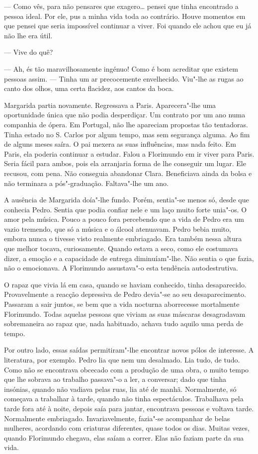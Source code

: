 --- Como vês, para não pensares que exagero\ldots{} pensei que tinha encontrado
a pessoa ideal. Por ele, pus a minha vida toda ao contrário. Houve
momentos em que pensei que seria impossível continuar a viver. Foi
quando ele achou que eu já não lhe era útil.

--- Vive do quê?

--- Ah, és tão maravilhosamente ingénuo! Como é bom acreditar que existem
pessoas assim. --- Tinha um ar precocemente envelhecido. Viu"-lhe as rugas
ao canto dos olhos, uma certa flacidez, aos cantos da boca.

Margarida partia novamente. Regressava a Paris. Aparecera"-lhe uma
oportunidade única que não podia desperdiçar. Um contrato por um ano
numa companhia de ópera. Em Portugal, não lhe apareciam propostas tão
tentadoras. Tinha estado no S. Carlos por algum tempo, mas sem segurança
alguma. Ao fim de alguns meses saíra. O pai mexera as suas influências,
mas nada feito. Em Paris, ela poderia continuar a estudar. Falou a
Florimundo em ir viver para Paris. Seria fácil para ambos, pois ela
arranjaria forma de lhe conseguir um lugar. Ele recusou, com pena. Não
conseguia abandonar Clara. Beneficiava ainda da bolsa e não terminara a
pós"-graduação. Faltava"-lhe um ano.

A ausência de Margarida doía"-lhe fundo. Porém, sentia"-se menos só, desde
que conhecia Pedro. Sentia que podia confiar nele e um laço muito forte
unia"-os. O amor pela música. Pouco a pouco fora percebendo que a vida de
Pedro era um vazio tremendo, que só a música e o álcool atenuavam. Pedro
bebia muito, embora nunca o tivesse visto realmente embriagado. Era
também nessa altura que melhor tocava, curiosamente. Quando estava a
seco, como ele costumava dizer, a emoção e a capacidade de entrega
diminuíam"-lhe. Não sentia o que fazia, não o emocionava. A Florimundo
assustava"-o esta tendência autodestrutiva.

O rapaz que vivia lá em casa, quando se haviam conhecido, tinha
desaparecido. Provavelmente a reacção depressiva de Pedro devia"-se ao
seu desaparecimento. Passaram a sair juntos, se bem que a vida nocturna
aborrecesse mortalmente Florimundo. Todas aquelas pessoas que viviam as
suas máscaras desagradavam sobremaneira ao rapaz que, nada habituado,
achava tudo aquilo uma perda de tempo.

Por outro lado, essas saídas permitiram"-lhe encontrar novos pólos de
interesse. A literatura, por exemplo. Pedro lia que nem um desalmado.
Lia tudo, de tudo. Como não se encontrava obcecado com a produção de uma
obra, o muito tempo que lhe sobrava ao trabalho passava"-o a ler, a
conversar; dado que tinha insónias, quando não vadiava pelas ruas, lia
até de manhã. Normalmente, só começava a trabalhar à tarde, quando não
tinha espectáculos. Trabalhava pela tarde fora até à noite, depois saía
para jantar, encontrava pessoas e voltava tarde. Normalmente embriagado.
Invariavelmente, fazia"-se acompanhar de belas mulheres, acordando com
criaturas diferentes, quase todos os dias. Muitas vezes, quando
Florimundo chegava, elas saíam a correr. Elas não faziam parte da sua
vida.

